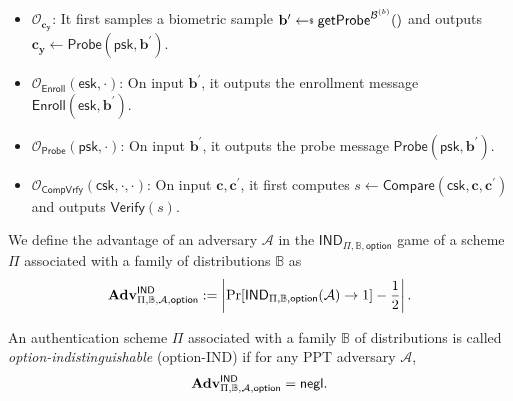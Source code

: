 \begin{itemize}

	
	\item $\mathcal{O}_{\mathbf{c_y}}$: It first samples a biometric sample $\mathbf{b}^{\prime} \getsdollar \textsf{getProbe}^{\mathcal{B}^{(b)} }()$ and outputs $\mathbf{c_y} \gets \textsf{Probe}(\textsf{psk}, \mathbf{b}^{\prime})$.

	\item $\mathcal{O}_\textsf{Enroll}(\textsf{esk}, \cdot)$: On input $\mathbf{b}^\prime$, it outputs the enrollment message $\textsf{Enroll}(\textsf{esk}, \mathbf{b}^\prime)$.

	\item $\mathcal{O}_\textsf{Probe}(\textsf{psk}, \cdot)$: On input $\mathbf{b}^\prime$, it outputs the probe message $\textsf{Probe}(\textsf{psk}, \mathbf{b}^\prime)$.
	
	\item $\mathcal{O}_\textsf{CompVrfy}(\textsf{csk}, \cdot, \cdot)$: On input $\mathbf{c}, \mathbf{c}^\prime$, it first computes $s \gets \textsf{Compare}(\textsf{csk}, \mathbf{c}, \mathbf{c}^\prime)$ and outputs $\textsf{Verify}(s)$.
\end{itemize}

We define the advantage of an adversary $\mathcal{A}$ in the $\textsf{IND}_{\Pi, \mathbb{B}, \textsf{option}}$ game of a scheme $\Pi$ associated with a family of distributions $\mathbb{B}$ as
\[
	\mathbf{Adv}^{\textsf{IND}}_{\Pi, \mathbb{B}, \mathcal{A}, \textsf{option}} := \left |\Pr[\textsf{IND}_{\Pi, \mathbb{B}, \textsf{option}}(\mathcal{A}) \to 1] - \frac{1}{2} \right|.
\]

An authentication scheme $\Pi$ associated with a family $\mathbb{B}$ of distributions is called \emph{\textsf{option}-indistinguishable} (\textsf{option}-IND) if for any PPT adversary $\mathcal{A}$,
\[
	\mathbf{Adv}^{\textsf{IND}}_{\Pi, \mathbb{B}, \mathcal{A}, \textsf{option}} = \mathsf{negl}.
\]

